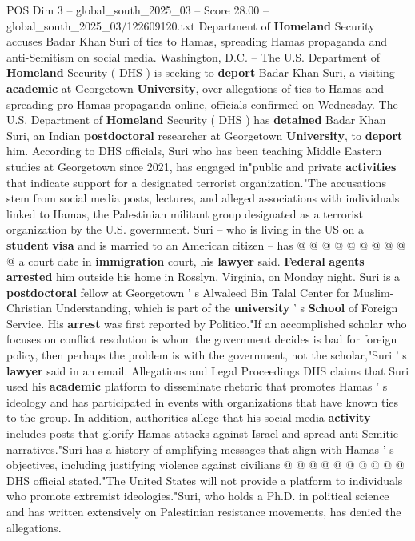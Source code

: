 \begin{textsample}{POS Dim 3 – global\_south\_2025\_03 – Score 28.00 – global\_south\_2025\_03/122609120.txt}  \label{ex:f3_pos_037}
Department of \textbf{Homeland} Security accuses Badar Khan Suri of ties to Hamas, spreading Hamas propaganda and anti-Semitism on social media.
Washington, D.C. -- The U.S.
Department of \textbf{Homeland} Security ( DHS ) is seeking to \textbf{deport} Badar Khan Suri, a visiting \textbf{academic} at Georgetown \textbf{University}, over allegations of ties to Hamas and spreading pro-Hamas propaganda online, officials confirmed on Wednesday.
The U.S.
Department of \textbf{Homeland} Security ( DHS ) has \textbf{detained} Badar Khan Suri, an Indian \textbf{postdoctoral} researcher at Georgetown \textbf{University}, to \textbf{deport} him.
According to DHS officials, Suri who has been teaching Middle Eastern studies at Georgetown since 2021, has engaged in"public and private \textbf{activities} that indicate support for a designated terrorist organization."The accusations stem from social media posts, lectures, and alleged associations with individuals linked to Hamas, the Palestinian militant group designated as a terrorist organization by the U.S. government.
Suri -- who is living in the US on a \textbf{student} \textbf{visa} and is married to an American citizen -- has @ @ @ @ @ @ @ @ @ @ a court date in \textbf{immigration} court, his \textbf{lawyer} said. \textbf{Federal} \textbf{agents} \textbf{arrested} him outside his home in Rosslyn, Virginia, on Monday night.
Suri is a \textbf{postdoctoral} fellow at Georgetown ' s Alwaleed Bin Talal Center for Muslim-Christian Understanding, which is part of the \textbf{university} ' s \textbf{School} of Foreign Service.
His \textbf{arrest} was first reported by Politico."If an accomplished scholar who focuses on conflict resolution is whom the government decides is bad for foreign policy, then perhaps the problem is with the government, not the scholar,"Suri ' s \textbf{lawyer} said in an email.
Allegations and Legal Proceedings DHS claims that Suri used his \textbf{academic} platform to disseminate rhetoric that promotes Hamas ' s ideology and has participated in events with organizations that have known ties to the group.
In addition, authorities allege that his social media \textbf{activity} includes posts that glorify Hamas attacks against Israel and spread anti-Semitic narratives."Suri has a history of amplifying messages that align with Hamas ' s objectives, including justifying violence against civilians @ @ @ @ @ @ @ @ @ @ DHS official stated."The United States will not provide a platform to individuals who promote extremist ideologies."Suri, who holds a Ph.D. in political science and has written extensively on Palestinian resistance movements, has denied the allegations.

\end{textsample}
